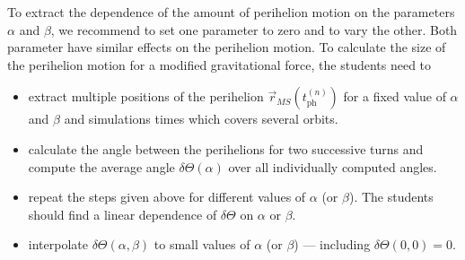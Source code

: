 \documentclass[12pt,ngerman,american]{iopart}
\begin{document}
To extract the dependence of the amount of perihelion motion
 on the parameters $\alpha$ and $\beta$, we recommend to set one parameter to zero and to vary the other.
Both parameter have similar effects on the perihelion motion.
To calculate the size of the perihelion motion for a modified gravitational force, the students need to
\begin{itemize}
\item extract multiple positions of the perihelion $\vec r_{MS} ( t_\mathrm{ph}^{(n)} )$ for a fixed value of $\alpha$ and $\beta$ and simulations times which covers several orbits.
\item calculate the angle between the perihelions for two successive turns and compute the average angle $\delta \Theta (\alpha)$ over all individually computed angles.
\item repeat the steps given above for different values of $\alpha$ (or $\beta$). The students should find a linear dependence of $\delta \Theta$ on $\alpha$ or $\beta$.
\item interpolate $\delta \Theta (\alpha, \beta)$ to small values of $\alpha$ (or $\beta$) --- including  $\delta \Theta(0,0)=0$.
\end{itemize}
\end{document}

